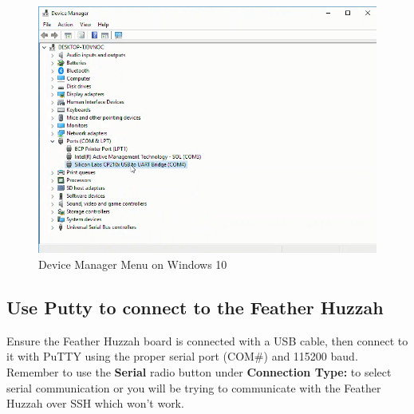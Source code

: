 \documentclass{book}
\makeatletter
\def\maxwidth{\ifdim\Gin@nat@width>\linewidth\linewidth
    \else\Gin@nat@width\fi}
\let\Oldincludegraphics\includegraphics
\renewcommand{\includegraphics}[1]{\Oldincludegraphics[width=.8\maxwidth]{#1}}
\makeatother
\begin{document}
\begin{figure}
\centering
\includegraphics{images/device_manager_menu.png}
\caption{Device Manager Menu on Windows 10}
\end{figure}

    \subsection{Use Putty to connect to the Feather
Huzzah}\label{use-putty-to-connect-to-the-feather-huzzah}

    Ensure the Feather Huzzah board is connected with a USB cable, then
connect to it with PuTTY using the proper serial port (COM\#) and 115200
baud. Remember to use the \textbf{Serial} radio button under
\textbf{Connection Type:} to select serial communication or you will be
trying to communicate with the Feather Huzzah over SSH which won't work.
\end{document}

